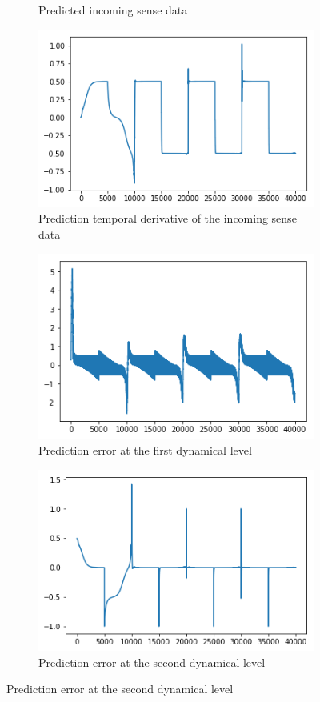 \begin{figure}[H]
\begin{subfigure}{.3\linewidth}
    \caption{Predicted incoming sense data}
\end{subfigure}

\bigskip
\begin{subfigure}{.3\linewidth}
    \centering
    \includegraphics[scale=0.4]{chapter_3_figures/sawtooth_predphidot.png}
    \caption{Prediction temporal derivative of the incoming sense data}
\end{subfigure}
\hfill
\begin{subfigure}{.3\linewidth}
    \centering
    \includegraphics[scale=0.4]{chapter_3_figures/sawtooth_pe1.png}
    \caption{Prediction error at the first dynamical level}
\end{subfigure}
\hfill
\begin{subfigure}{.3\linewidth}
    \centering
    \includegraphics[scale=0.4]{chapter_3_figures/sawtooth_pe2.png}
    \caption{Prediction error at the second dynamical level}
\end{subfigure}
    

\end{figure}
